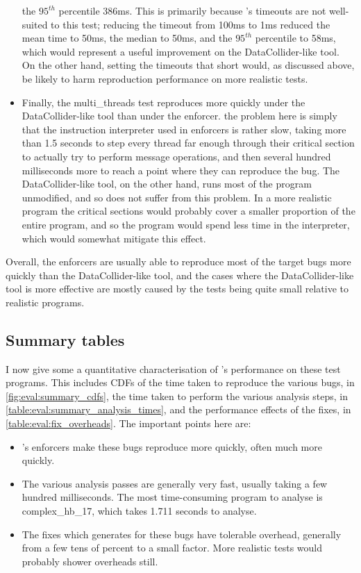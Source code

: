 \begin{itemize}
  the $95^{th}$ percentile 386ms.  This is primarily because
  {\technique}'s timeouts are not well-suited to this test; reducing
  the timeout from 100ms to 1ms reduced the mean time to 50ms, the
  median to 50ms, and the $95^{th}$ percentile to 58ms, which would
  represent a useful improvement on the DataCollider-like tool.  On
  the other hand, setting the timeouts that short would, as discussed
  above, be likely to harm reproduction performance on more realistic
  tests.
\item Finally, the multi\_threads test reproduces more quickly under
  the DataCollider-like tool than under the {\technique} enforcer.
  the problem here is simply that the instruction interpreter used in
  {\technique} enforcers is rather slow, taking more than 1.5 seconds
  to step every thread far enough through their critical section to
  actually try to perform message operations, and then several hundred
  milliseconds more to reach a point where they can reproduce the bug.
  The DataCollider-like tool, on the other hand, runs most of the
  program unmodified, and so does not suffer from this problem.  In a
  more realistic program the critical sections would probably cover a
  smaller proportion of the entire program, and so the program would
  spend less time in the interpreter, which would somewhat mitigate
  this effect.
\end{itemize}

Overall, the {\technique} enforcers are usually able to reproduce most
of the target bugs more quickly than the DataCollider-like tool, and
the cases where the DataCollider-like tool is more effective are
mostly caused by the tests being quite small relative to realistic
programs.

\subsection{Summary tables}

I now give some a quantitative characterisation of {\technique}'s
performance on these test programs.  This includes CDFs of the time
taken to reproduce the various bugs, in
\autoref{fig:eval:summary_cdfs}, the time taken to perform the various
analysis steps, in \autoref{table:eval:summary_analysis_times}, and
the performance effects of the fixes, in
\autoref{table:eval:fix_overheads}.  The important points here are:

\begin{itemize}
\item {\Technique}'s enforcers make these bugs reproduce more quickly,
  often much more quickly.
\item The various analysis passes are generally very fast, usually
  taking a few hundred milliseconds.  The most time-consuming program
  to analyse is complex\_hb\_17, which takes 1.711 seconds to analyse.
\item The fixes which {\technique} generates for these bugs have
  tolerable overhead, generally from a few tens of percent to a small
  factor.  More realistic tests would probably shower overheads still.
\end{itemize}


